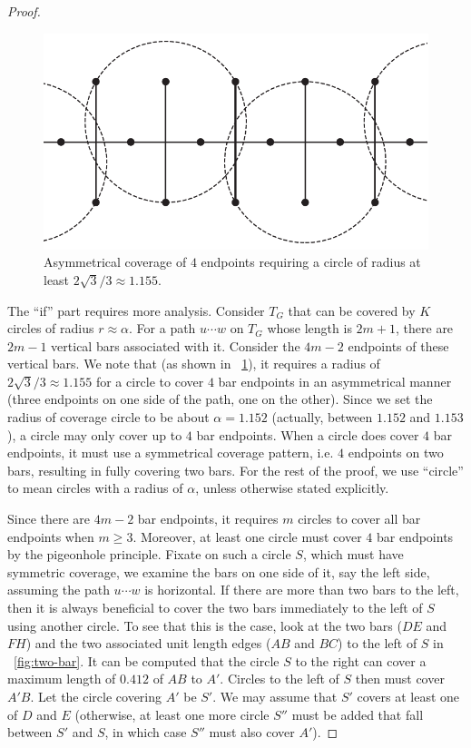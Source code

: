 \begin{proof}
  \begin{figure}[!ht]
    \centering
    \includegraphics[scale=0.33]{chapters/osg/figures/edgepath3-eps-converted-to.pdf}
  \vspace*{1mm}
    \caption{Asymmetrical coverage of $4$ endpoints requiring a circle of 
    radius at least $2\sqrt{3}/3\approx 1.155$.}
    \label{fig:pathcovert}
  \end{figure}

The ``if'' part requires more analysis. Consider $T_G$ that can be covered 
by $K$ circles of radius $r \approx \alpha$. For a path $u\cdots w$ on $T_G$ whose 
length is $2m+1$, there are $2m-1$ vertical bars associated with it. Consider 
the $4m-2$ endpoints of these vertical bars. We note that (as shown in 
~\ref{fig:pathcovert}), it requires a radius of $2\sqrt{3}/3\approx 1.155$ 
for a circle to cover $4$ bar endpoints in an asymmetrical manner (three endpoints
on one side of the path, one on the other). Since 
we set the radius of coverage circle to be about $\alpha = 1.152$ (actually, 
between $1.152$ and $1.153$),
a circle may only cover up to $4$ bar endpoints. When a circle does cover $4$ 
bar endpoints, it must use a symmetrical coverage pattern, i.e. $4$ endpoints
on two bars, resulting in fully covering two bars. For the 
rest of the proof, we use ``circle'' to mean circles with a radius of $\alpha$,
unless otherwise stated explicitly. 

Since there are $4m - 2$ bar endpoints, it requires $m$ circles to cover all 
bar endpoints when $m \ge 3$. Moreover, at least one circle must cover $4$ 
bar endpoints by the pigeonhole principle. Fixate on such a circle $S$, which 
must have symmetric coverage, we examine the bars on one side of it, say the 
left side, assuming the path $u\cdots w$ is horizontal. If there are more 
than two bars to the left, then it is always beneficial to cover the two bars 
immediately to the left of $S$ using another circle. To see that this is the 
case, look at the two bars ($DE$ and $FH$) and the two associated unit 
length edges ($AB$ and $BC$) to the left of $S$ in ~\ref{fig:two-bar}.
It can be computed that the circle $S$ to the right can cover a maximum 
length of $0.412$ of $AB$ to $A'$. Circles to the left of $S$ then must cover 
$A'B$. Let the circle covering $A'$ be $S'$. We may assume that 
$S'$ covers at least one of $D$ and $E$ (otherwise, at least one more circle 
$S''$ must be added that fall between $S'$ and $S$, in which case $S''$ 
must also cover $A'$). 


\end{proof}
